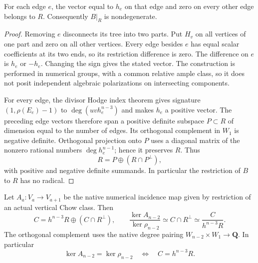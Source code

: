 \begin{lemma}
\label{r17ft:positive}
For each edge $e$, the vector equal to $h_e$ on that edge and
zero on every other edge belongs to $R$.  Consequently $B|_R$
is nondegenerate.
\end{lemma}

\begin{proof}
Removing $e$ disconnects its tree into two parts.  Put $H_v$
on all vertices of one part and zero on all other vertices.
Every edge besides $e$ has equal scalar coefficients at its
two ends, so its restriction difference is zero.  The difference
on $e$ is $h_e$ or $-h_e$.  Changing the sign gives the stated
vector.  The construction is performed in numerical groups,
with a common relative ample class, so it does not posit
independent algebraic polarizations on intersecting components.

For every edge, the divisor Hodge index theorem gives signature
$(1,\rho(E_e)-1)$ to $\deg(uvh_e^{n-3})$ and makes $h_e$ a
positive vector.  The preceding edge vectors therefore span
a positive definite subspace $P\subset R$ of dimension equal
to the number of edges.  Its orthogonal complement in $W_1$
is negative definite.  Orthogonal projection onto $P$ uses a
diagonal matrix of the nonzero rational numbers
$\deg h_e^{n-1}$; hence it preserves $R$.  Thus
\[
                    R=P\oplus(R\cap P^\perp),
\]
with positive and negative definite summands.  In particular
the restriction of $B$ to $R$ has no radical.
\end{proof}

\begin{proposition}
\label{r17ft:kernel}
Let $A_a:V_a\to V_{a+1}$ be the native numerical incidence
map given by restriction of an actual vertical Chow class.
Then
\[
 C=h^{n-3}R\oplus(C\cap R^\perp),\qquad
 \frac{\ker A_{n-2}}{\ker\rho_{n-2}}
       \simeq C\cap R^\perp
       \simeq\frac{C}{h^{n-3}R}.
 \tag{FT17.4}\label{r17ft:defect}
\]
The orthogonal complement uses the native degree pairing
$W_{n-2}\times W_1\to\mathbf Q$.
In particular
\[
          \ker A_{n-2}=\ker\rho_{n-2}
          \quad\Longleftrightarrow\quad C=h^{n-3}R.
 \tag{FT17.5}\label{r17ft:equivalence}
\]
\end{proposition}

